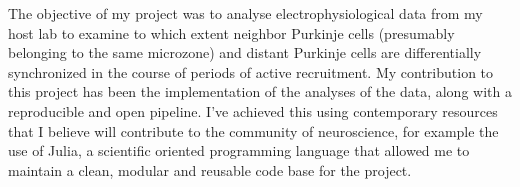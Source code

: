 The objective of my project was to analyse electrophysiological data from my host lab to examine to which extent neighbor Purkinje cells (presumably belonging to the same microzone) and distant Purkinje cells are differentially synchronized in the course of periods of active recruitment.
My contribution to this project has been the implementation of the analyses of the data, along with a reproducible and open pipeline. I've achieved this using contemporary resources that I believe will contribute to the community of neuroscience, for example the use of Julia, a scientific oriented programming language that allowed me to maintain a clean, modular and reusable code base for the project. 

